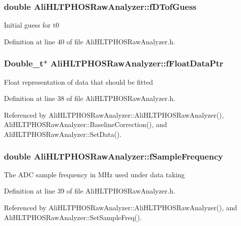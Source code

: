 \subsubsection{\setlength{\rightskip}{0pt plus 5cm}double {\bf Ali\-HLTPHOSRaw\-Analyzer::f\-DTof\-Guess}\hspace{0.3cm}{\tt  [protected, inherited]}}\label{classAliHLTPHOSRawAnalyzer_AliHLTPHOSRawAnalyzerPeakFinderp2}


Initial guess for t0 

Definition at line 40 of file Ali\-HLTPHOSRaw\-Analyzer.h.
\subsubsection{\setlength{\rightskip}{0pt plus 5cm}Double\_\-t$\ast$ {\bf Ali\-HLTPHOSRaw\-Analyzer::f\-Float\-Data\-Ptr}\hspace{0.3cm}{\tt  [protected, inherited]}}\label{classAliHLTPHOSRawAnalyzer_AliHLTPHOSRawAnalyzerPeakFinderp0}


Float representation of data that should be fitted 

Definition at line 38 of file Ali\-HLTPHOSRaw\-Analyzer.h.

Referenced by Ali\-HLTPHOSRaw\-Analyzer::Ali\-HLTPHOSRaw\-Analyzer(), Ali\-HLTPHOSRaw\-Analyzer::Baseline\-Correction(), and Ali\-HLTPHOSRaw\-Analyzer::Set\-Data().
\subsubsection{\setlength{\rightskip}{0pt plus 5cm}double {\bf Ali\-HLTPHOSRaw\-Analyzer::f\-Sample\-Frequency}\hspace{0.3cm}{\tt  [protected, inherited]}}\label{classAliHLTPHOSRawAnalyzer_AliHLTPHOSRawAnalyzerPeakFinderp1}


The ADC sample frequency in MHz used under data taking 

Definition at line 39 of file Ali\-HLTPHOSRaw\-Analyzer.h.

Referenced by Ali\-HLTPHOSRaw\-Analyzer::Ali\-HLTPHOSRaw\-Analyzer(), and Ali\-HLTPHOSRaw\-Analyzer::Set\-Sample\-Freq().
